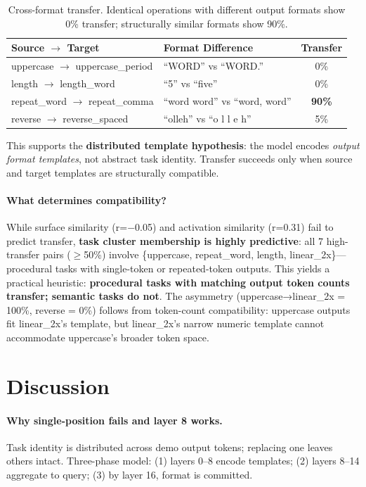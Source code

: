 \documentclass{article}
\begin{document}
\begin{table}[t]
\caption{Cross-format transfer. Identical operations with different output formats show 0\% transfer; structurally similar formats show 90\%.}
\label{tab:format}
\centering
\small
\begin{tabular}{@{}llc@{}}
\toprule
Source $\to$ Target & Format Difference & Transfer \\
\midrule
uppercase $\to$ uppercase\_period & ``WORD'' vs ``WORD.'' & 0\% \\
length $\to$ length\_word & ``5'' vs ``five'' & 0\% \\
repeat\_word $\to$ repeat\_comma & ``word word'' vs ``word, word'' & \textbf{90\%} \\
reverse $\to$ reverse\_spaced & ``olleh'' vs ``o l l e h'' & 5\% \\
\bottomrule
\end{tabular}
\end{table}

This supports the \textbf{distributed template hypothesis}: the model encodes \emph{output format templates}, not abstract task identity. Transfer succeeds only when source and target templates are structurally compatible.

\paragraph{What determines compatibility?} While surface similarity (r=$-$0.05) and activation similarity (r=0.31) fail to predict transfer, \textbf{task cluster membership is highly predictive}: all 7 high-transfer pairs ($\geq$50\%) involve \{uppercase, repeat\_word, length, linear\_2x\}---procedural tasks with single-token or repeated-token outputs. This yields a practical heuristic: \textbf{procedural tasks with matching output token counts transfer; semantic tasks do not}. The asymmetry (uppercase→linear\_2x = 100\%, reverse = 0\%) follows from token-count compatibility: uppercase outputs fit linear\_2x's template, but linear\_2x's narrow numeric template cannot accommodate uppercase's broader token space.

\section{Discussion}

\paragraph{Why single-position fails and layer 8 works.}
Task identity is distributed across demo output tokens; replacing one leaves others intact. Three-phase model: (1) layers 0--8 encode templates; (2) layers 8--14 aggregate to query; (3) by layer 16, format is committed.
\end{document}

